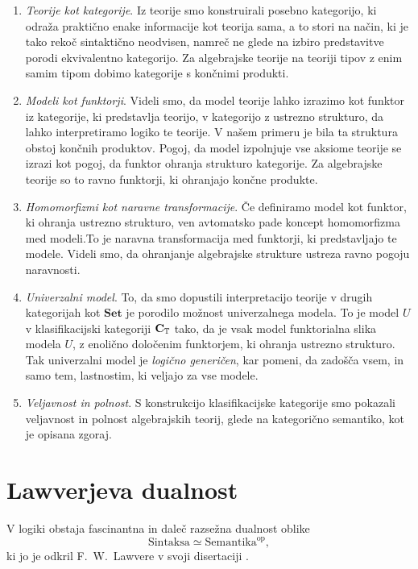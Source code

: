 \documentclass[../kategoricna_logika.tex]{subfiles}
\begin{document}
\begin{enumerate}
\item \emph{Teorije kot kategorije}. Iz teorije smo konstruirali posebno
  kategorijo, ki odraža praktično enake informacije kot teorija sama,
  a to stori na način, ki je tako rekoč sintaktično neodvisen, namreč
  ne glede na izbiro predstavitve porodi ekvivalentno kategorijo.
  Za algebrajske teorije na teoriji tipov z enim samim tipom dobimo
  kategorije s končnimi produkti.
\item \emph{Modeli kot funktorji}. Videli smo, da model teorije lahko izrazimo
  kot funktor iz kategorije, ki predstavlja teorijo, v kategorijo z ustrezno
  strukturo, da lahko interpretiramo logiko te teorije. V našem primeru
  je bila ta struktura obstoj končnih produktov. Pogoj, da model izpolnjuje
  vse aksiome teorije se izrazi kot pogoj, da funktor ohranja strukturo
  kategorije. Za algebrajske teorije so to ravno funktorji, ki ohranjajo
  končne produkte.
\item \emph{Homomorfizmi kot naravne transformacije}. Če definiramo model
  kot funktor, ki ohranja ustrezno strukturo, ven avtomatsko pade koncept
  homomorfizma med modeli.To je naravna transformacija med funktorji, ki
  predstavljajo te modele. Videli smo, da ohranjanje algebrajske strukture
  ustreza ravno pogoju naravnosti.
\item \emph{Univerzalni model}. To, da smo dopustili interpretacijo teorije
  v drugih kategorijah kot $\mathbf{Set}$ je porodilo možnost univerzalnega
  modela. To je model $U$ v klasifikacijski kategoriji ${\operatorname{\mathbf{C}}}_{\mathbb{T}}$ tako,
  da je vsak model funktorialna slika modela $U$, z enolično določenim
  funktorjem, ki ohranja ustrezno strukturo. Tak univerzalni model je
  \emph{logično generičen}, kar pomeni, da zadošča vsem, in samo tem,
  lastnostim, ki veljajo za vse modele.
\item \emph{Veljavnost in polnost}. S konstrukcijo klasifikacijske kategorije
  smo pokazali veljavnost in polnost algebrajskih teorij, glede na
  kategorično semantiko, kot je opisana zgoraj.
\end{enumerate}
% 
%
%
\section{Lawverjeva dualnost}
%
V logiki obstaja fascinantna in daleč razsežna dualnost oblike
\[ \mathrm{Sintaksa} \simeq \mathrm{Semantika}^{\mathrm{op}}, \]
ki jo je odkril F.~W.~Lawvere v svoji disertaciji \cite{lawvere1963functorial}.
\end{document}
